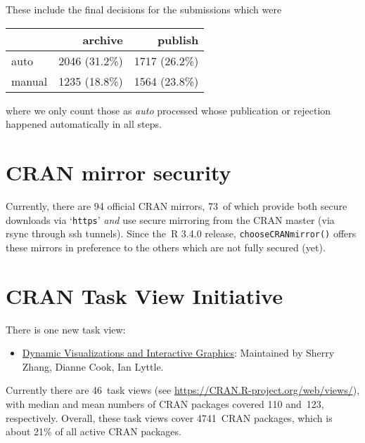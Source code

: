 These include the final decisions for the submissions which were

\begin{longtable}[]{@{}lrr@{}}
\toprule\noalign{}
& archive & publish \\
\midrule\noalign{}
\endhead
\bottomrule\noalign{}
\endlastfoot
auto & 2046 (31.2\%) & 1717 (26.2\%) \\
manual & 1235 (18.8\%) & 1564 (23.8\%) \\
\end{longtable}

\noindent where we only count those as \emph{auto} processed whose publication or
rejection happened automatically in all steps.

\section{CRAN mirror security}\label{cran-mirror-security}

Currently, there are 94 official CRAN mirrors,
73~of which provide both
secure downloads via `\texttt{https}' \emph{and} use secure mirroring from the CRAN master
(via rsync through ssh tunnels). Since the~R 3.4.0 release, \texttt{chooseCRANmirror()}
offers these mirrors in preference to the others which are not fully secured (yet).

\section{CRAN Task View Initiative}\label{cran-task-view-initiative}

There is one new task view:

\begin{itemize}
\tightlist
\item
  \href{https://CRAN.R-project.org/view=DynamicVisualizations}{Dynamic Visualizations and Interactive Graphics}: Maintained by Sherry Zhang, Dianne Cook, Ian Lyttle.
\end{itemize}

Currently there are 46~task views (see \url{https://CRAN.R-project.org/web/views/}),
with median and mean numbers of CRAN packages covered
110 and~123, respectively.
Overall, these task views cover 4741~CRAN packages,
which is about 21\% of all active CRAN packages.


\address{%
Kurt Hornik\\
WU Wirtschaftsuniversität Wien\\%
Austria\\
%
%
\textit{ORCiD: \href{https://orcid.org/0000-0003-4198-9911}{0000-0003-4198-9911}}\\%
\href{mailto:Kurt.Hornik@R-project.org}{\nolinkurl{Kurt.Hornik@R-project.org}}%
}

